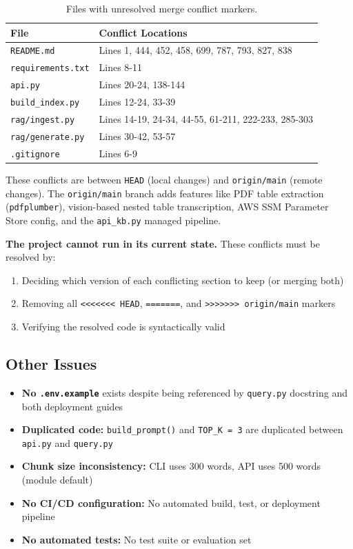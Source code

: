 \documentclass[11pt,a4paper]{paper}
\begin{document}
\begin{table}[h]
\centering
\small
\begin{tabular}{>{\raggedright}p{5.0cm} >{\raggedright\arraybackslash}p{9.5cm}}
\toprule
\textbf{File} & \textbf{Conflict Locations} \\
\midrule
\texttt{README.md} & Lines 1, 444, 452, 458, 699, 787, 793, 827, 838 \\
\texttt{requirements.txt} & Lines 8-11 \\
\texttt{api.py} & Lines 20-24, 138-144 \\
\texttt{build\_index.py} & Lines 12-24, 33-39 \\
\texttt{rag/ingest.py} & Lines 14-19, 24-34, 44-55, 61-211, 222-233, 285-303 \\
\texttt{rag/generate.py} & Lines 30-42, 53-57 \\
\texttt{.gitignore} & Lines 6-9 \\
\bottomrule
\end{tabular}
\caption{Files with unresolved merge conflict markers.}
\label{tab:conflicts}
\end{table}

These conflicts are between \texttt{HEAD} (local changes) and \texttt{origin/main} (remote changes). The \texttt{origin/main} branch adds features like PDF table extraction (\texttt{pdfplumber}), vision-based nested table transcription, AWS SSM Parameter Store config, and the \texttt{api\_kb.py} managed pipeline.

\textbf{The project cannot run in its current state.} These conflicts must be resolved by:
\begin{enumerate}
  \item Deciding which version of each conflicting section to keep (or merging both)
  \item Removing all \texttt{<<<<<<< HEAD}, \texttt{=======}, and \texttt{>>>>>>> origin/main} markers
  \item Verifying the resolved code is syntactically valid
\end{enumerate}

\subsection{Other Issues}

\begin{itemize}
  \item \textbf{No \texttt{.env.example}} exists despite being referenced by \texttt{query.py} docstring and both deployment guides
  \item \textbf{Duplicated code:} \texttt{build\_prompt()} and \texttt{TOP\_K = 3} are duplicated between \texttt{api.py} and \texttt{query.py}
  \item \textbf{Chunk size inconsistency:} CLI uses 300 words, API uses 500 words (module default)
  \item \textbf{No CI/CD configuration:} No automated build, test, or deployment pipeline
  \item \textbf{No automated tests:} No test suite or evaluation set
\end{itemize}
\end{document}
